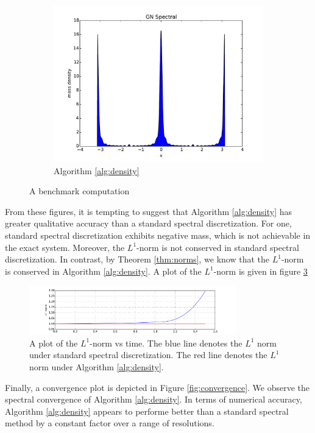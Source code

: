 \documentclass[final,leqno]{siamltex1213}
\begin{document}
\begin{figure}
\begin{subfigure}{0.3\textwidth}
		\includegraphics[width=\textwidth]{./images/gn_spectral_1D.pdf}
		\caption{Algorithm \ref{alg:density}}
		\label{fig:gn spectral}
	\end{subfigure}
	\caption{A benchmark computation}
	\label{fig:S1}
\end{figure}

From these figures, it is tempting to suggest that Algorithm \ref{alg:density} has greater qualitative accuracy than a standard spectral discretization.
For one, standard spectral discretization exhibits negative mass, which is not achievable in the exact system.
Moreover, the $L^{1}$-norm is not conserved in standard spectral discretization.  In contrast, by Theorem \ref{thm:norms}, we know that
the $L^{1}$-norm is conserved in Algorithm \ref{alg:density}.
A plot of the $L^{1}$-norm is given in figure \ref{fig:L1}

\begin{figure}
	\centering
	\includegraphics[width=0.8\textwidth]{./images/L1_plot.pdf}
	\caption{A plot of the $L^{1}$-norm vs time.
		The blue line denotes the $L^{1}$ norm under standard spectral discretization.
		The red line denotes the $L^{1}$ norm under Algorithm \ref{alg:density}.
	}
	\label{fig:L1}
\end{figure}


Finally, a convergence plot is depicted in Figure \ref{fig:convergence}.  We observe the spectral convergence of Algorithm \ref{alg:density}.
In terms of numerical accuracy, Algorithm \ref{alg:density} appears to performe better than a standard spectral method by a constant factor over a range of resolutions.
\end{document}

